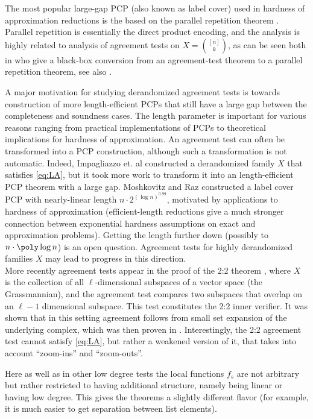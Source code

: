 \documentclass{article}[11pt]
\begin{document}
The most popular large-gap PCP (also known as label cover) used in hardness of approximation reductions is the based on the parallel repetition theorem \cite{Raz-parrep}. Parallel repetition is essentially the direct product encoding, and the analysis is highly related to analysis of agreement tests on $X=\binom{[n]}k$, as can be seen both in \cite{ImpagliazzoKW2012} who give a black-box conversion from an agreement-test theorem to a parallel repetition theorem, see also \cite{DinurS14, DinurS14-parrep}.

A major motivation for studying derandomized agreement tests is towards construction of more length-efficient PCPs that still have a large gap between the completeness and soundness cases. The length parameter is important for various reasons ranging from practical implementations of PCPs to theoretical implications for hardness of approximation. An agreement test can often be transformed into a PCP construction, although such a transformation is not automatic. Indeed, Impagliazzo et. al  \cite{ImpagliazzoKW2012} constructed a derandomized family $X$ that satisfies \eqref{eq:LA}, but it took more work \cite{DinurM11} to transform it into an length-efficient PCP theorem with a large gap. Moshkovitz and Raz \cite{MR10} constructed a label cover PCP with nearly-linear length $n \cdot 2^{(\log n)^{0.99}}$, motivated by applications to hardness of approximation (efficient-length reductions give a much stronger connection between exponential hardness assumptions on exact and approximation problems). Getting the length further down (possibly to $n\cdot\poly\log n$) is an open question. 
Agreement tests for highly derandomized  families $X$ may lead to progress in this direction. 
\\



More recently agreement tests appear in the proof of the 2:2 theorem \cite{DKKMS,KMS}, where $X$ is the collection of all $\ell$-dimensional subspaces of a vector space (the Grassmannian), and the agreement test compares two subspaces that overlap on an $\ell-1$ dimensional subspace. This test constitutes the 2:2 inner verifier. It was shown \cite{BarakKS19} that in this setting agreement follows from small set expansion of the underlying complex, which was then proven in \cite{KMS}. Interestingly, the 2:2 agreement test cannot satisfy \eqref{eq:LA}, but rather a weakened version of it, that takes into account ``zoom-ins'' and ``zoom-outs''. 

Here as well as in other low degree tests the local functions $f_s$ are not arbitrary but rather restricted to having additional structure, namely being linear or having low degree. This gives the theorems a slightly different flavor (for example, it is much easier to get separation between list elements). 
\end{document}
